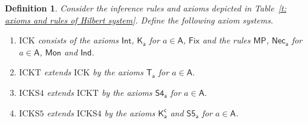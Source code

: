 \documentclass{myifcolog}
\newcommand{\K}{K}
\newcommand\A{\mathsf{A}}
\newcommand{\agi}{a}
\newcommand{\hick}{\mathrm{ICK}}
\newtheorem{definition}[theorem]{Definition}
\numberwithin{theorem}{section}
\begin{document}
\begin{definition}
    Consider the inference rules and axioms depicted in Table~\ref{t: axioms and rules of Hilbert system}. Define the following axiom systems.
    \begin{enumerate}
        \item $\hick$ consists of the axioms $\mathsf{Int}$, $\mathsf{K_\agi}$ for $\agi \in \A$, $\mathsf{Fix}$ and the rules $\mathsf{MP}$, $\mathsf{Nec_\agi}$ for $\agi \in \A$, $\mathsf{Mon}$ and $\mathsf{Ind}$.
        \item $\mathrm{ICKT}$ extends $\mathrm{ICK}$ by the axioms $\mathsf{T_\agi}$ for $\agi \in \A$.
        \item $\mathrm{ICKS4}$ extends $\mathrm{ICKT}$ by the axioms $\mathsf{S4_\agi}$ for $\agi \in \A$.
        \item $\mathrm{ICKS5}$ extends $\mathrm{ICKS4}$ by the axioms $\mathsf{\K_\agi^c}$ and $\mathsf{S5_\agi}$ for $\agi \in \A$.
    \end{enumerate}
\end{definition}
\end{document}
